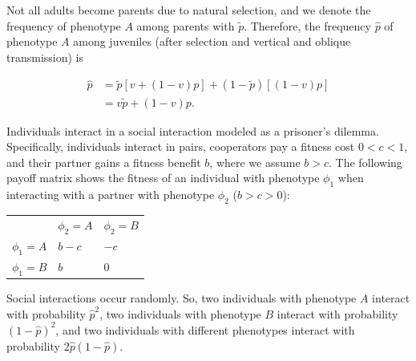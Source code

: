 \documentclass[12pt]{extarticle}
\begin{document}
Not all adults become parents due to natural selection, and we denote the frequency of phenotype $A$ among parents with $\tilde{p}$.
Therefore, the frequency $\hat{p}$ of  phenotype $A$ among juveniles (after selection and vertical and oblique transmission) is

\begin{equation}\label{eq:horizontal}
\begin{aligned}
\hat{p}
& = \tilde{p} [v + (1-v)p] + (1-\tilde{p}) [(1-v)p] \\
& = v \tilde{p} + (1-v) p.
\end{aligned}
\end{equation}

Individuals interact in a social interaction modeled as a prisoner's dilemma.
Specifically, individuals interact in pairs, cooperators pay a fitness cost $0<c<1$, and their partner gains a fitness benefit $b$, where we assume $b>c$. The following payoff matrix shows the fitness of an individual with phenotype $\phi_1$ when interacting with a partner with phenotype $\phi_2$ ($b>c>0$):

\begin{table}[h]\label{table:prisoner_payoff}
\centering
\begin{tabular}{lll}
           & $\phi_2=A$ & $\phi_2=B$ \\
$\phi_1=A$ & $b-c$      & $-c$       \\
$\phi_1=B$ & $b$        & $0$       
\end{tabular}
\end{table}

Social interactions occur randomly.
So, two individuals with phenotype $A$ interact with probability $\hat{p}^2$, two individuals with phenotype $B$ interact with probability $(1-\hat{p})^2$, and two individuals with different phenotypes interact with probability $2\hat{p}(1-\hat{p})$. 

%
\end{document}
